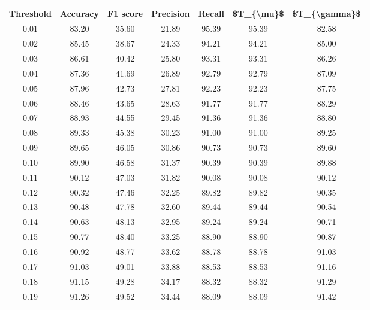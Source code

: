 \begin{tabular}{|c|c|c|c|c|c|c|}
\hline
 Threshold &  Accuracy &  F1 score &  Precision &  Recall &  \$T\_\{\textbackslash mu\}\$ &  \$T\_\{\textbackslash gamma\}\$ \\
\hline
      0.01 &     83.20 &     35.60 &      21.89 &   95.39 &      95.39 &         82.58 \\
      0.02 &     85.45 &     38.67 &      24.33 &   94.21 &      94.21 &         85.00 \\
      0.03 &     86.61 &     40.42 &      25.80 &   93.31 &      93.31 &         86.26 \\
      0.04 &     87.36 &     41.69 &      26.89 &   92.79 &      92.79 &         87.09 \\
      0.05 &     87.96 &     42.73 &      27.81 &   92.23 &      92.23 &         87.75 \\
      0.06 &     88.46 &     43.65 &      28.63 &   91.77 &      91.77 &         88.29 \\
      0.07 &     88.93 &     44.55 &      29.45 &   91.36 &      91.36 &         88.80 \\
      0.08 &     89.33 &     45.38 &      30.23 &   91.00 &      91.00 &         89.25 \\
      0.09 &     89.65 &     46.05 &      30.86 &   90.73 &      90.73 &         89.60 \\
      0.10 &     89.90 &     46.58 &      31.37 &   90.39 &      90.39 &         89.88 \\
      0.11 &     90.12 &     47.03 &      31.82 &   90.08 &      90.08 &         90.12 \\
      0.12 &     90.32 &     47.46 &      32.25 &   89.82 &      89.82 &         90.35 \\
      0.13 &     90.48 &     47.78 &      32.60 &   89.44 &      89.44 &         90.54 \\
      0.14 &     90.63 &     48.13 &      32.95 &   89.24 &      89.24 &         90.71 \\
      0.15 &     90.77 &     48.40 &      33.25 &   88.90 &      88.90 &         90.87 \\
      0.16 &     90.92 &     48.77 &      33.62 &   88.78 &      88.78 &         91.03 \\
      0.17 &     91.03 &     49.01 &      33.88 &   88.53 &      88.53 &         91.16 \\
      0.18 &     91.15 &     49.28 &      34.17 &   88.32 &      88.32 &         91.29 \\
      0.19 &     91.26 &     49.52 &      34.44 &   88.09 &      88.09 &         91.42 \\

\end{tabular}
